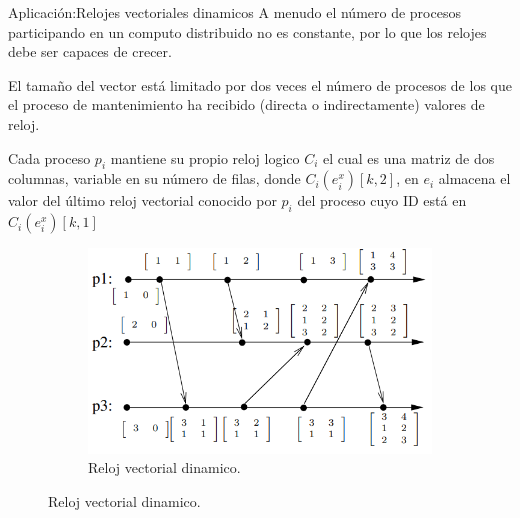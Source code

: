 \begin{frame}[fragile]{Aplicación:}{Relojes vectoriales dinamicos}
    \justifying
    A menudo el número de procesos participando en un computo distribuido no es constante, por lo que los relojes debe ser capaces de crecer.
    

    El tamaño del vector está limitado por dos veces el número de procesos de los que el proceso de mantenimiento ha recibido (directa o indirectamente) valores de reloj.
    
    Cada proceso $p_i$ mantiene su propio reloj logico $C_i$ el cual es una matriz de dos columnas, variable en su número de filas, donde $C_i(e_i^x)[k,2]$, en $e_i$ almacena el valor del último reloj vectorial conocido por $p_i$ del proceso cuyo ID está en $C_i(e_i^x)[k,1]$ 

    \begin{figure}
        \centering
        \begin{subfigure}[b]{0.5\textwidth}
            \includegraphics[width=\textwidth]{./rvd01.png}
            \caption{Reloj vectorial dinamico.}\label{fig:Deteccion.}
            \label{fig:Relojes vectoriales dinamicos}
        \end{subfigure}
    \end{figure}    
\end{frame}